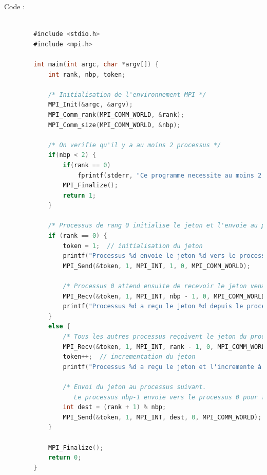 \documentclass[a4paper,13pt]{book}
\begin{document}
Code : \\

	\begin{lstlisting}[language=C]

        #include <stdio.h>
        #include <mpi.h>
        
        int main(int argc, char *argv[]) {
            int rank, nbp, token;
        
            /* Initialisation de l'environnement MPI */
            MPI_Init(&argc, &argv);
            MPI_Comm_rank(MPI_COMM_WORLD, &rank);
            MPI_Comm_size(MPI_COMM_WORLD, &nbp);
        
            /* On verifie qu'il y a au moins 2 processus */
            if(nbp < 2) {
                if(rank == 0)
                    fprintf(stderr, "Ce programme necessite au moins 2 processus.\n");
                MPI_Finalize();
                return 1;
            }
        
            /* Processus de rang 0 initialise le jeton et l'envoie au processus de rang 1 */
            if (rank == 0) {
                token = 1;  // initialisation du jeton
                printf("Processus %d envoie le jeton %d vers le processus 1\n", rank, token);
                MPI_Send(&token, 1, MPI_INT, 1, 0, MPI_COMM_WORLD);
                
                /* Processus 0 attend ensuite de recevoir le jeton venant du dernier processus */
                MPI_Recv(&token, 1, MPI_INT, nbp - 1, 0, MPI_COMM_WORLD, MPI_STATUS_IGNORE);
                printf("Processus %d a reçu le jeton %d depuis le processus %d\n", rank, token, nbp - 1);
            }
            else {
                /* Tous les autres processus reçoivent le jeton du processus precedent */
                MPI_Recv(&token, 1, MPI_INT, rank - 1, 0, MPI_COMM_WORLD, MPI_STATUS_IGNORE);
                token++;  // incrementation du jeton
                printf("Processus %d a reçu le jeton et l'incremente à %d\n", rank, token);
        
                /* Envoi du jeton au processus suivant.
                   Le processus nbp-1 envoie vers le processus 0 pour fermer l'anneau. */
                int dest = (rank + 1) % nbp;
                MPI_Send(&token, 1, MPI_INT, dest, 0, MPI_COMM_WORLD);
            }
        
            MPI_Finalize();
            return 0;
        }
        
\end{lstlisting}
\end{document}
